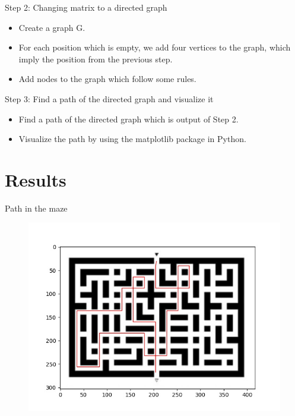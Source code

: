\documentclass[10pt]{beamer}
\begin{document}
\begin{frame}{Step 2: Changing matrix to a directed graph}
\begin{itemize}
    \item Create a graph G.
    \item For each position which is empty, we add four vertices to the graph, which imply the position from the previous step.
    \item Add nodes to the graph which follow some rules.
\end{itemize}
\end{frame}


\begin{frame}{Step 3: Find a path of the directed graph and visualize it}
\begin{itemize}
    \item Find a path of the directed graph which is output of Step 2.
    \item Visualize the path by using the matplotlib package in Python.
\end{itemize}
\end{frame}

\section{Results}

\begin{frame}{Path in the maze}
  \begin{figure}[htb!] %
    \centering
    \includegraphics[trim={0cm 0cm 0cm 0cm},clip,scale=0.6]{../images/output_image.jpg}
    \label{fig:} %
  \end{figure}

\end{frame}
\end{document}
